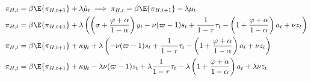 \begin{align}
    \pi_{H,t} &= \beta \E \{\pi_{H,t+1}\} + \lambda \hat{\mu}_t \implies \pi_{H,t} = \beta \E \{\pi_{H,t+1}\} - \lambda \mu_t \\
    \pi_{H,t} &= \beta \E \{\pi_{H,t+1}\} + \lambda \left(\left(\sigma + \frac{\varphi + \alpha}{1-\alpha}\right)y_t - \nu (\varpi - 1) s_t + \frac{1}{1-\tau}\tau_t  - \left(1 + \frac{\varphi + \alpha}{1-\alpha}\right)a_t + \nu z_t\right) \\
    \pi_{H,t} &= \beta \E \{\pi_{H,t+1}\} + \kappa y_t + \lambda \left(- \nu (\varpi - 1) s_t + \frac{1}{1-\tau}\tau_t  - \left(1 + \frac{\varphi + \alpha}{1-\alpha}\right)a_t + \nu z_t\right) \\
    \pi_{H,t} &= \beta \E \{\pi_{H,t+1}\} + \kappa y_t - \lambda \nu (\varpi - 1) s_t + \lambda\frac{1}{1-\tau}\tau_t  - \lambda\left(1 + \frac{\varphi + \alpha}{1-\alpha}\right)a_t + \lambda\nu z_t \\
\end{align}
\pagebreak
